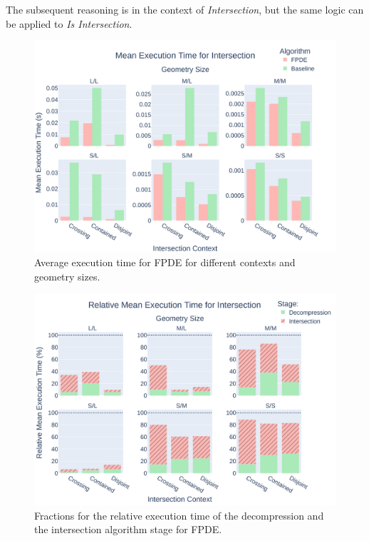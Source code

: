 The subsequent reasoning is in the context of \textit{Intersection}, but the same logic can be applied to \textit{Is Intersection}.

\begin{figure}[htbp]
    \centering
        \includegraphics[width=14.5cm]{images/intersection_fpde_vs_baseline.png}

        \caption{Average execution time for FPDE for different contexts and geometry sizes. }
        \label{img:meanIntersection}
\end{figure}

\begin{figure}[htbp]
    \centering
    \includegraphics[width=14.5cm]{images/relative_mean_exec_time.png}
    \caption{Fractions for the relative execution time of the decompression and the intersection algorithm stage for FPDE. }
    \label{img:Intersection_exec_time}
\end{figure}

